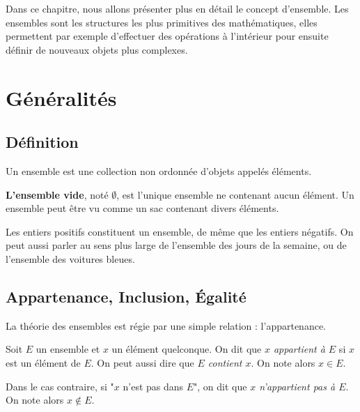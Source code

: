 
\minitoc

Dans ce chapitre, nous allons présenter plus en détail le concept d'ensemble. 
Les ensembles sont les structures les plus primitives des mathématiques, elles permettent par exemple d'effectuer des opérations 
à l'intérieur pour ensuite définir de nouveaux objets plus complexes. 


\section{Généralités}

\subsection{Définition}

\begin{definition}[Ensemble]
    Un ensemble est une collection non ordonnée d'objets appelés éléments. 
\end{definition}

\textbf{L'ensemble vide}, noté $ \emptyset $, est l’unique ensemble ne contenant aucun élément. 
Un ensemble peut être vu comme un sac contenant divers éléments. 

\begin{example}
    Les entiers positifs constituent un ensemble, de même que les entiers négatifs. 
    On peut aussi parler au sens plus large de l'ensemble des jours de la semaine, ou de l'ensemble 
    des voitures bleues. 
\end{example}

\subsection{Appartenance, Inclusion, Égalité}

La théorie des ensembles est régie par une simple relation : l'appartenance. 

\begin{definition}[Appartenance]
    Soit $E$ un ensemble et $x$ un élément quelconque. 
    On dit que \emph{$x$ appartient à $E$} si $x$ est un élément de $E$. 
    On peut aussi dire que \emph{$E$ contient $x$}. On note alors 
    $x \in E$. 

    Dans le cas contraire, si "$x$ n'est pas dans $E$", on dit que 
    \emph{$x$ n'appartient pas à $E$}. 
    On note alors $x \notin E$. 
\end{definition}

